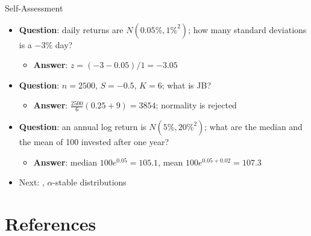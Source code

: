 \begin{frame}{Self-Assessment}
\itemsize{\small}
\begin{itemize}
    \item \textbf{Question}: daily returns are $N(0.05\%, 1\%^2)$; how many standard deviations is a $-3\%$ day?
    \begin{itemize}
        \item \textbf{Answer}: $z = (-3 - 0.05)/1 = -3.05$
    \end{itemize}
    \item \textbf{Question}: $n = 2500$, $S = -0.5$, $K = 6$; what is JB?
    \begin{itemize}
        \item \textbf{Answer}: $\frac{2500}{6}(0.25 + 9) = 3854$; normality is rejected
    \end{itemize}
    \item \textbf{Question}: an annual log return is $N(5\%, 20\%^2)$; what are the median and the mean of 100 invested after one year?
    \begin{itemize}
        \item \textbf{Answer}: median $100e^{0.05} = 105.1$, mean $100e^{0.05 + 0.02} = 107.3$
    \end{itemize}
    \item Next: , $\alpha$-stable distributions
\end{itemize}
\end{frame}


\section{References}

